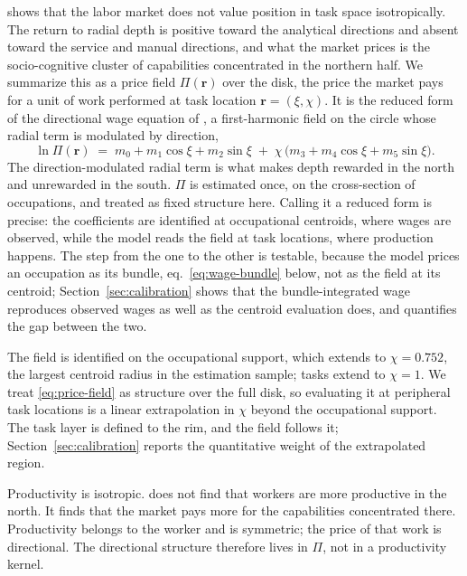 \documentclass[12pt, a4paper]{article}
\begin{document}
\textcite{storck2026geometry} shows that the labor market does not
value position in task space isotropically. The return to radial depth
is positive toward the analytical directions and absent toward the
service and manual directions, and what the market prices is the
socio-cognitive cluster of capabilities concentrated in the northern
half. We summarize this as a price field $\Pi(\mathbf{r})$ over the
disk, the price the market pays for a unit of work performed at task
location $\mathbf{r} = (\xi, \chi)$. It is the reduced form of the
directional wage equation of \textcite{storck2026geometry}, a
first-harmonic field on the circle
whose radial term is modulated by direction,
\begin{equation}
  \ln \Pi(\mathbf{r})
  \;=\;
  m_0 + m_1 \cos\xi + m_2 \sin\xi
  \;+\; \chi\,\bigl(m_3 + m_4 \cos\xi + m_5 \sin\xi\bigr).
  \label{eq:price-field}
\end{equation}
The direction-modulated radial term is what makes depth rewarded in
the north and unrewarded in the south. $\Pi$ is estimated once, on the
cross-section of occupations, and treated as fixed structure here.
Calling it a reduced form is precise: the coefficients are identified
at occupational centroids, where wages are observed, while the model
reads the field at task locations, where production happens. The step
from the one to the other is testable, because the model prices an
occupation as its bundle, eq.~\eqref{eq:wage-bundle} below, not as the
field at its centroid; Section~\ref{sec:calibration} shows that the
bundle-integrated wage reproduces observed wages as well as the
centroid evaluation does, and quantifies the gap between the two.

The field is identified on the occupational support, which extends to
$\chi = 0.752$, the largest centroid radius in the estimation sample;
tasks extend to $\chi = 1$. We treat \eqref{eq:price-field} as
structure over the full disk, so evaluating it at peripheral task
locations is a linear extrapolation in $\chi$ beyond the occupational
support. The task layer is defined to the rim, and the field follows
it; Section~\ref{sec:calibration} reports the quantitative weight of
the extrapolated region.

Productivity is isotropic. \textcite{storck2026geometry} does not
find that workers are more productive in the north. It finds that the
market pays more for the capabilities concentrated there. Productivity
belongs to the worker and is symmetric; the price of that work is
directional. The directional structure therefore lives in $\Pi$, not
in a productivity kernel.
\end{document}
